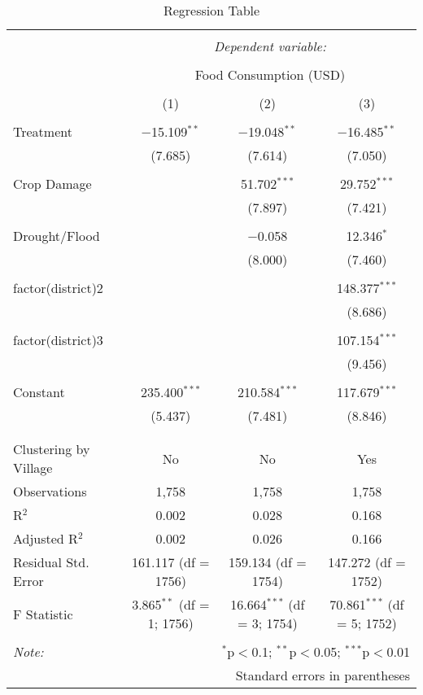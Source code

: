 
\begin{table}[!htbp] \centering 
  \caption{Regression Table} 
  \label{} 
\begin{tabular}{@{\extracolsep{5pt}}lccc} 
\\[-1.8ex]\hline 
\hline \\[-1.8ex] 
 & \multicolumn{3}{c}{\textit{Dependent variable:}} \\ 
\cline{2-4} 
\\[-1.8ex] & \multicolumn{3}{c}{Food Consumption (USD)} \\ 
\\[-1.8ex] & (1) & (2) & (3)\\ 
\hline \\[-1.8ex] 
 Treatment & $-$15.109$^{**}$ & $-$19.048$^{**}$ & $-$16.485$^{**}$ \\ 
  & (7.685) & (7.614) & (7.050) \\ 
  & & & \\ 
 Crop Damage &  & 51.702$^{***}$ & 29.752$^{***}$ \\ 
  &  & (7.897) & (7.421) \\ 
  & & & \\ 
 Drought/Flood &  & $-$0.058 & 12.346$^{*}$ \\ 
  &  & (8.000) & (7.460) \\ 
  & & & \\ 
 factor(district)2 &  &  & 148.377$^{***}$ \\ 
  &  &  & (8.686) \\ 
  & & & \\ 
 factor(district)3 &  &  & 107.154$^{***}$ \\ 
  &  &  & (9.456) \\ 
  & & & \\ 
 Constant & 235.400$^{***}$ & 210.584$^{***}$ & 117.679$^{***}$ \\ 
  & (5.437) & (7.481) & (8.846) \\ 
  & & & \\ 
\hline \\[-1.8ex] 
Clustering by Village & No & No & Yes \\ 
Observations & 1,758 & 1,758 & 1,758 \\ 
R$^{2}$ & 0.002 & 0.028 & 0.168 \\ 
Adjusted R$^{2}$ & 0.002 & 0.026 & 0.166 \\ 
Residual Std. Error & 161.117 (df = 1756) & 159.134 (df = 1754) & 147.272 (df = 1752) \\ 
F Statistic & 3.865$^{**}$ (df = 1; 1756) & 16.664$^{***}$ (df = 3; 1754) & 70.861$^{***}$ (df = 5; 1752) \\ 
\hline 
\hline \\[-1.8ex] 
\textit{Note:}  & \multicolumn{3}{r}{$^{*}$p$<$0.1; $^{**}$p$<$0.05; $^{***}$p$<$0.01} \\ 
 & \multicolumn{3}{r}{Standard errors in parentheses} \\ 
\end{tabular} 
\end{table} 
